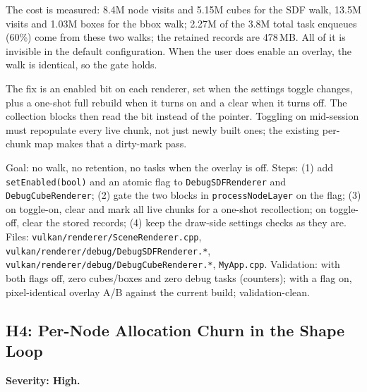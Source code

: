 \documentclass[11pt,a4paper]{article}
\begin{document}
The cost is measured: 8.4M node visits and 5.15M cubes for the SDF walk,
13.5M visits and 1.03M boxes for the bbox walk; 2.27M of the 3.8M total task
enqueues (60\%) come from these two walks; the retained records are 478\,MB.
All of it is invisible in the default configuration. When the user does
enable an overlay, the walk is identical, so the gate holds.

The fix is an enabled bit on each renderer, set when the settings toggle
changes, plus a one-shot full rebuild when it turns on and a clear when it
turns off. The collection blocks then read the bit instead of the pointer.
Toggling on mid-session must repopulate every live chunk, not just newly
built ones; the existing per-chunk map makes that a dirty-mark pass.

\begin{tcolorbox}[promptbox={Prompt --- H3: gate debug collection on the settings}]
Goal: no walk, no retention, no tasks when the overlay is off. Steps:
(1) add \texttt{setEnabled(bool)} and an atomic flag to
\texttt{DebugSDFRenderer} and \texttt{DebugCubeRenderer}; (2) gate the two
blocks in \texttt{processNodeLayer} on the flag; (3) on toggle-on, clear and
mark all live chunks for a one-shot recollection; on toggle-off, clear the
stored records; (4) keep the draw-side settings checks as they are. Files:
\texttt{vulkan/\allowbreak renderer/\allowbreak SceneRenderer.cpp},
\texttt{vulkan/\allowbreak renderer/\allowbreak debug/\allowbreak DebugSDFRenderer.*},
\texttt{vulkan/\allowbreak renderer/\allowbreak debug/\allowbreak DebugCubeRenderer.*}, \texttt{MyApp.cpp}.
Validation: with both flags off, zero cubes/boxes and zero debug tasks
(counters); with a flag on, pixel-identical overlay A/B against the current
build; validation-clean.
\end{tcolorbox}

\subsection{H4: Per-Node Allocation Churn in the Shape Loop}
\label{sec:h4}

\textbf{Severity: High.}
\end{document}
